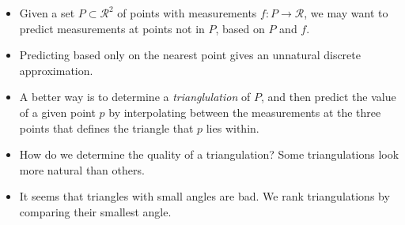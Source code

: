 \newcommand{\T}{\mathcal{T}}
\newcommand{\V}{\mathcal{V}}
\newcommand{\D}{\mathcal{V}}
\newcommand{\DG}{\mathcal{DG}}
\newcommand{\DT}{\mathcal{DT}}
\renewcommand{\S}{\mathcal{S}}
\newcommand{\Vor}{\mathrm{Vor}}

\begin{itemize}
\item Given a set $P \subset \mathcal{R}^2$ of points with
  measurements $f : P \rightarrow \mathcal{R}$, we may want to predict
  measurements at points not in $P$, based on $P$ and $f$.
\item Predicting based only on the nearest point gives an unnatural
  discrete approximation.
\item A better way is to determine a \emph{trianglulation} of $P$, and
  then predict the value of a given point $p$ by interpolating between
  the measurements at the three points that defines the triangle that
  $p$ lies within.
\item How do we determine the quality of a triangulation? Some
  triangulations look more natural than others.
\item It seems that triangles with small angles are bad. We rank
  triangulations by comparing their smallest angle.
\end{itemize}

